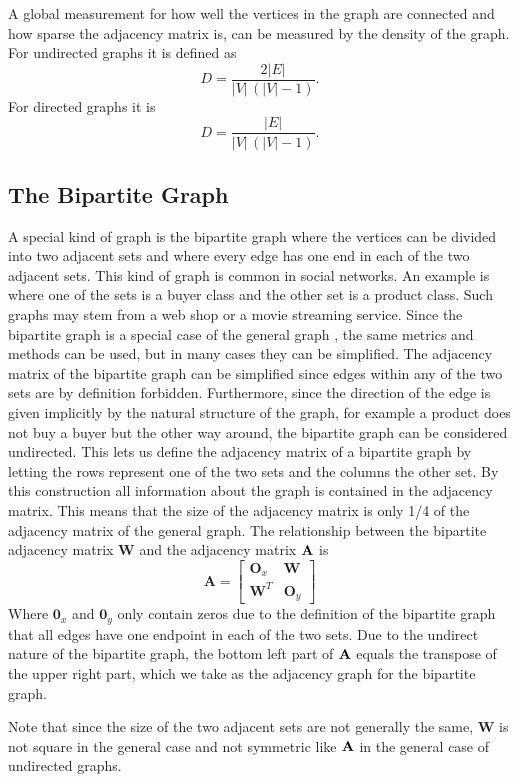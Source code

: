 A global measurement for how well the vertices in the graph are connected and how sparse the adjacency matrix is, can be measured by the density of the graph. For undirected graphs it is defined as\cite{density}
$$D =  \frac{2|E|}{|V|\,(|V|-1)}.$$
For directed graphs it is
$$D = \frac{|E|}{|V|\,(|V|-1)}.$$

\subsection{The Bipartite Graph}\label{subsec:bigraph}
A special kind of graph is the bipartite graph where the vertices can be divided into two adjacent sets and where every edge has one end in each of the two adjacent sets. This kind of graph is common in social networks. An example is where one of the sets is a buyer class and the other set is a product class. Such graphs may stem from a web shop or a movie streaming service. Since the bipartite graph is a special case of the general graph \graph, the same metrics and methods can be used, but in many cases they can be simplified. The adjacency matrix of the bipartite graph can be simplified since edges within any of the two sets are by definition forbidden. Furthermore, since the direction of the edge is given implicitly by the natural structure of the graph, for example a product does not buy a buyer but the other way around, the bipartite graph can be considered undirected. This lets us define the adjacency matrix of a bipartite graph by letting the rows represent one of the two sets and the columns the other set. By this construction all information about the graph is contained in the adjacency matrix. This means that the size of the adjacency matrix is only 1/4 of the adjacency matrix of the general graph. The relationship between the bipartite adjacency matrix $\textbf{W}$ and the adjacency matrix $\textbf{A}$ is
$$
\textbf{A} = \left[
\begin{matrix}
  \textbf{O}_x & \textbf{W} \\
  \textbf{W}^T & \textbf{O}_y
\end{matrix}
\right]
$$
Where $\textbf{0}_x$ and $\textbf{0}_y$ only contain zeros due to the definition of the bipartite graph that all edges have one endpoint in each of the two sets. Due to the undirect nature of the bipartite graph, the bottom left part of $\textbf{A}$ equals the transpose of the upper right part, which we take as the adjacency graph for the bipartite graph.

Note that since the size of the two adjacent sets are not generally the same, $\textbf{W}$ is not square in the general case and not symmetric like $\textbf{A}$ in the general case of undirected graphs.

